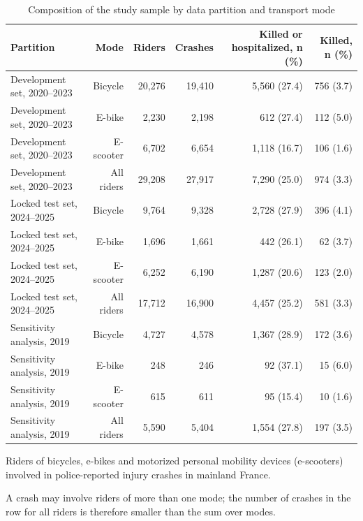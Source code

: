 \begin{table}[tp]
\centering\small
\caption{Composition of the study sample by data partition and transport mode}\label{tab:table2}
\begin{threeparttable}
\begin{tabular}{lrrrrr}
\toprule
Partition & Mode & Riders & Crashes & Killed or hospitalized, n (\%) & Killed, n (\%) \\
\midrule
Development set, 2020–2023 & Bicycle & 20,276 & 19,410 & 5,560 (27.4) & 756 (3.7) \\
Development set, 2020–2023 & E-bike & 2,230 & 2,198 & 612 (27.4) & 112 (5.0) \\
Development set, 2020–2023 & E-scooter & 6,702 & 6,654 & 1,118 (16.7) & 106 (1.6) \\
Development set, 2020–2023 & All riders & 29,208 & 27,917 & 7,290 (25.0) & 974 (3.3) \\
Locked test set, 2024–2025 & Bicycle & 9,764 & 9,328 & 2,728 (27.9) & 396 (4.1) \\
Locked test set, 2024–2025 & E-bike & 1,696 & 1,661 & 442 (26.1) & 62 (3.7) \\
Locked test set, 2024–2025 & E-scooter & 6,252 & 6,190 & 1,287 (20.6) & 123 (2.0) \\
Locked test set, 2024–2025 & All riders & 17,712 & 16,900 & 4,457 (25.2) & 581 (3.3) \\
Sensitivity analysis, 2019 & Bicycle & 4,727 & 4,578 & 1,367 (28.9) & 172 (3.6) \\
Sensitivity analysis, 2019 & E-bike & 248 & 246 & 92 (37.1) & 15 (6.0) \\
Sensitivity analysis, 2019 & E-scooter & 615 & 611 & 95 (15.4) & 10 (1.6) \\
Sensitivity analysis, 2019 & All riders & 5,590 & 5,404 & 1,554 (27.8) & 197 (3.5) \\
\bottomrule
\end{tabular}
\begin{tablenotes}[flushleft]\footnotesize
\item Riders of bicycles, e-bikes and motorized personal mobility devices (e-scooters) involved in police-reported injury crashes in mainland France.
\item A crash may involve riders of more than one mode; the number of crashes in the row for all riders is therefore smaller than the sum over modes.
\end{tablenotes}
\end{threeparttable}
\end{table}
